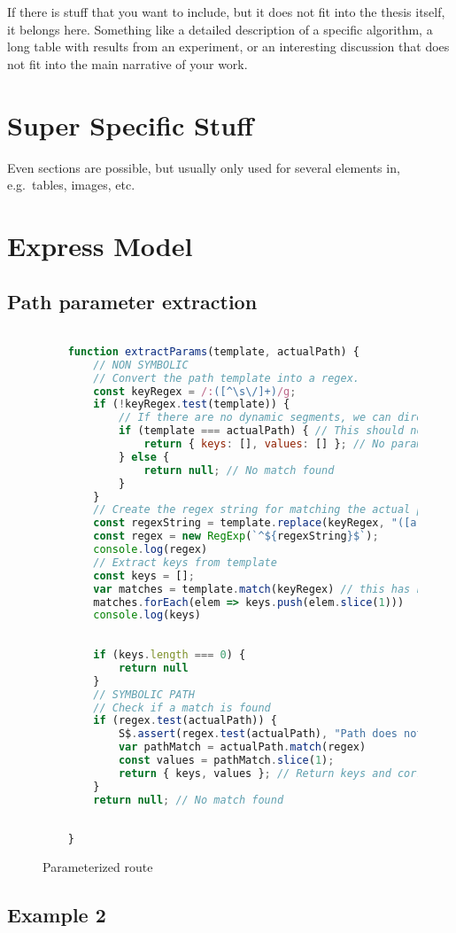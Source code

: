 If there is stuff that you want to include, but it does not fit into the thesis itself, it belongs here.
Something like a detailed description of a specific algorithm, a long table with results from an experiment, or an interesting discussion that does not fit into the main narrative of your work.

\section*{Super Specific Stuff}

Even sections are possible, but usually only used for several elements in, e.g.\ tables, images, etc.

\section*{Express Model}
\subsection*{Path parameter extraction}
\begin{figure}[h]
    \begin{lstlisting}[language=JavaScript, gobble=4]

    function extractParams(template, actualPath) {
        // NON SYMBOLIC
        // Convert the path template into a regex. 
        const keyRegex = /:([^\s\/]+)/g;
        if (!keyRegex.test(template)) {
            // If there are no dynamic segments, we can directly compare the paths
            if (template === actualPath) { // This should not be reachable
                return { keys: [], values: [] }; // No parameters, match is found
            } else {
                return null; // No match found
            }
        }
        // Create the regex string for matching the actual path
        const regexString = template.replace(keyRegex, "([a-zA-Z0-9]{1,10})");
        const regex = new RegExp(`^${regexString}$`);
        console.log(regex)
        // Extract keys from template
        const keys = [];
        var matches = template.match(keyRegex) // this has nothing symbolic
        matches.forEach(elem => keys.push(elem.slice(1)))
        console.log(keys)
    
    
        if (keys.length === 0) {
            return null
        }
        // SYMBOLIC PATH
        // Check if a match is found 
        if (regex.test(actualPath)) {
            S$.assert(regex.test(actualPath), "Path does not match")
            var pathMatch = actualPath.match(regex)
            const values = pathMatch.slice(1);
            return { keys, values }; // Return keys and corresponding values}
        }
        return null; // No match found
    
    
    }

    \end{lstlisting}
    \caption{Parameterized route}
    \label{fig:param-extract}
\end{figure}


\subsection*{Example 2}
